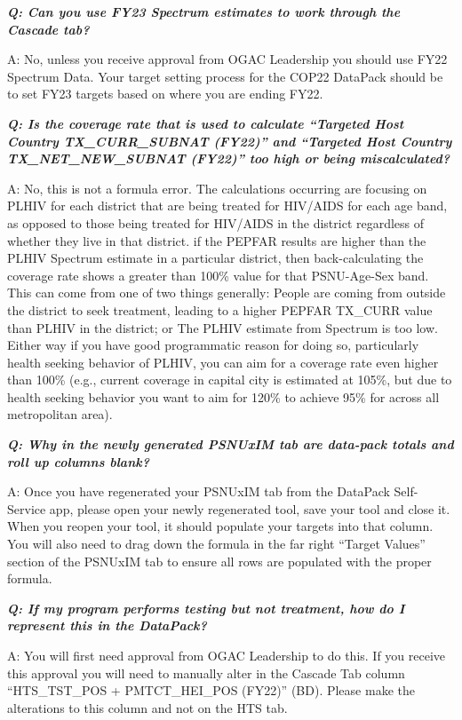 \documentclass[
  openany]{book}
\begin{document}
\textbf{\emph{Q: Can you use FY23 Spectrum estimates to work through the Cascade tab?}}

A: No, unless you receive approval from OGAC Leadership you should use FY22 Spectrum Data. Your target setting process for the COP22 DataPack should be to set FY23 targets based on where you are ending FY22.

\textbf{\emph{Q: Is the coverage rate that is used to calculate ``Targeted Host Country TX\_CURR\_SUBNAT (FY22)'' and ``Targeted Host Country TX\_NET\_NEW\_SUBNAT (FY22)'' too high or being miscalculated?}}

A: No, this is not a formula error. The calculations occurring are focusing on PLHIV for each district that are being treated for HIV/AIDS for each age band, as opposed to those being treated for HIV/AIDS in the district regardless of whether they live in that district. if the PEPFAR results are higher than the PLHIV Spectrum estimate in a particular district, then back-calculating the coverage rate shows a greater than 100\% value for that PSNU-Age-Sex band. This can come from one of two things generally: People are coming from outside the district to seek treatment, leading to a higher PEPFAR TX\_CURR value than PLHIV in the district; or The PLHIV estimate from Spectrum is too low. Either way if you have good programmatic reason for doing so, particularly health seeking behavior of PLHIV, you can aim for a coverage rate even higher than 100\% (e.g., current coverage in capital city is estimated at 105\%, but due to health seeking behavior you want to aim for 120\% to achieve 95\% for across all metropolitan area).

\textbf{\emph{Q: Why in the newly generated PSNUxIM tab are data-pack totals and roll up columns blank?}}

A: Once you have regenerated your PSNUxIM tab from the DataPack Self-Service app, please open your newly regenerated tool, save your tool and close it. When you reopen your tool, it should populate your targets into that column. You will also need to drag down the formula in the far right ``Target Values'' section of the PSNUxIM tab to ensure all rows are populated with the proper formula.

\textbf{\emph{Q: If my program performs testing but not treatment, how do I represent this in the DataPack?}}

A: You will first need approval from OGAC Leadership to do this. If you receive this approval you will need to manually alter in the Cascade Tab column ``HTS\_TST\_POS + PMTCT\_HEI\_POS (FY22)'' (BD). Please make the alterations to this column and not on the HTS tab.
\end{document}

